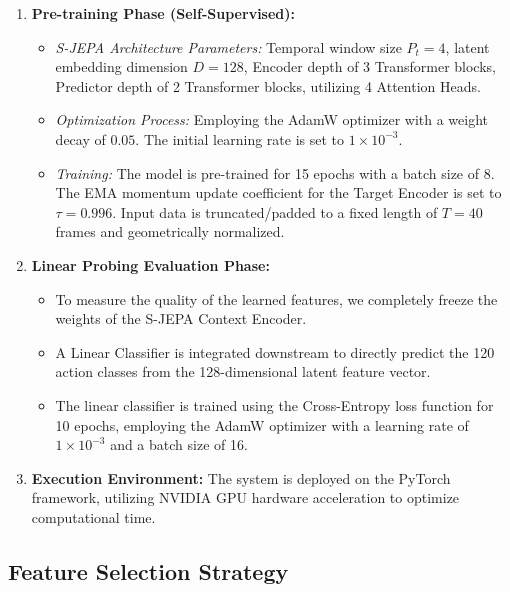 \documentclass[conference]{IEEEtran}
\begin{document}
\begin{enumerate}
    \item \textbf{Pre-training Phase (Self-Supervised):}
    \begin{itemize}
        \item \textit{S-JEPA Architecture Parameters:} Temporal window size $P_t = 4$, latent embedding dimension $D = 128$, Encoder depth of 3 Transformer blocks, Predictor depth of 2 Transformer blocks, utilizing 4 Attention Heads.
        \item \textit{Optimization Process:} Employing the AdamW optimizer \cite{b13} with a weight decay of $0.05$. The initial learning rate is set to $1 \times 10^{-3}$.
        \item \textit{Training:} The model is pre-trained for 15 epochs with a batch size of 8. The EMA momentum update coefficient for the Target Encoder is set to $\tau = 0.996$. Input data is truncated/padded to a fixed length of $T = 40$ frames and geometrically normalized.
    \end{itemize}
    
    \item \textbf{Linear Probing Evaluation Phase:}
    \begin{itemize}
        \item To measure the quality of the learned features, we completely freeze the weights of the S-JEPA Context Encoder.
        \item A Linear Classifier is integrated downstream to directly predict the 120 action classes from the 128-dimensional latent feature vector.
        \item The linear classifier is trained using the Cross-Entropy loss function for 10 epochs, employing the AdamW optimizer \cite{b13} with a learning rate of $1 \times 10^{-3}$ and a batch size of 16.
    \end{itemize}
    
    \item \textbf{Execution Environment:} The system is deployed on the PyTorch framework, utilizing NVIDIA GPU hardware acceleration to optimize computational time.
\end{enumerate}

\subsection{Feature Selection Strategy}
\end{document}
